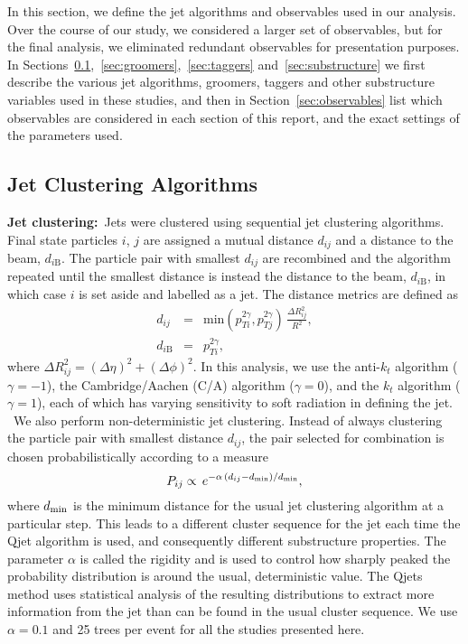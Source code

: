 In this section, we define the jet algorithms and observables used in our analysis. Over the course of our study, we considered a larger set of observables, but for the final analysis, we eliminated redundant observables for presentation purposes. In Sections~\ref{sec:jetalgs},~\ref{sec:groomers},~\ref{sec:taggers} and~\ref{sec:substructure} we first describe the various jet algorithms, groomers, taggers and other substructure variables used in these studies, and then in Section~\ref{sec:observables} list which observables are considered in each section of this report, and the exact settings of the parameters used.

\subsection{Jet Clustering Algorithms}
\label{sec:jetalgs}

{\bf Jet clustering:}~Jets were clustered using sequential jet clustering algorithms. Final state particles $i$, $j$ are assigned a mutual distance $d_{ij}$ and a distance to the beam, $d_{i\mathrm{B}}$. The particle pair with smallest $d_{ij}$ are  recombined and the algorithm repeated until the smallest distance is instead the distance to the beam, $d_{i\mathrm{B}}$, in which case $i$ is set aside and labelled as a jet. The distance metrics are defined as
%
\begin{eqnarray}
d_{ij} &=& \mathrm{min}(p_{Ti}^{2\gamma},p_{Tj}^{2\gamma})\,\frac{\Delta R_{ij}^2}{R^2},\\
d_{i\mathrm{B}} &=& p_{Ti}^{2\gamma},
\end{eqnarray}
%
where $\Delta R_{ij}^2=(\Delta \eta)^2+(\Delta\phi)^2$. In this analysis, we use the anti-$k_t$ algorithm ($\gamma=-1$), the Cambridge/Aachen (C/A) algorithm ($\gamma=0$), and the $k_t$ algorithm ($\gamma=1$), each of which has varying sensitivity to soft radiation in defining the jet.\\

~We also perform non-deterministic jet clustering. Instead of always clustering the particle pair with smallest distance $d_{ij}$, the pair selected for combination is chosen probabilistically according to a measure
%
\begin{equation}
P_{ij} \propto \,e^{-\alpha \,(d_{ij}-d_{\rm min})/d_{\rm min}},
\end{equation}
%
where $d_{\rm min}$ is the minimum distance for the usual jet clustering algorithm at a particular step. This leads to a different cluster sequence for the jet each time the Qjet algorithm is used, and consequently different substructure properties. The parameter $\alpha$ is called the rigidity and is used to control how sharply peaked the probability distribution is around the usual, deterministic value. The Qjets method uses statistical analysis of the resulting distributions to extract more information from the jet than can be found in the usual cluster sequence. We use $\alpha=0.1$ and 25 trees per event for all the studies presented here.

